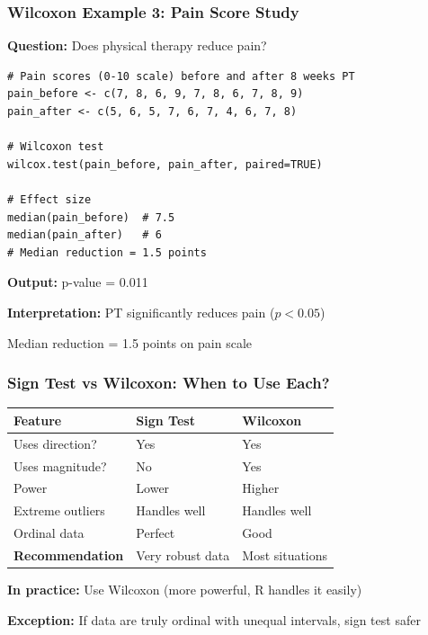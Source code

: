 \documentclass{beamer}
\begin{document}
\begin{frame}[fragile]
\frametitle{Wilcoxon Example 3: Pain Score Study}
\textbf{Question:} Does physical therapy reduce pain?

\vspace{0.3cm}
\begin{small}
\begin{verbatim}
# Pain scores (0-10 scale) before and after 8 weeks PT
pain_before <- c(7, 8, 6, 9, 7, 8, 6, 7, 8, 9)
pain_after <- c(5, 6, 5, 7, 6, 7, 4, 6, 7, 8)

# Wilcoxon test
wilcox.test(pain_before, pain_after, paired=TRUE)

# Effect size
median(pain_before)  # 7.5
median(pain_after)   # 6
# Median reduction = 1.5 points
\end{verbatim}
\end{small}

\textbf{Output:} p-value = 0.011

\textbf{Interpretation:} PT significantly reduces pain ($p < 0.05$)

Median reduction = 1.5 points on pain scale
\end{frame}

\begin{frame}
\frametitle{Sign Test vs Wilcoxon: When to Use Each?}

\begin{center}
\small
\begin{tabular}{lp{4cm}p{4cm}}
\toprule
\textbf{Feature} & \textbf{Sign Test} & \textbf{Wilcoxon} \\
\midrule
Uses direction? & Yes & Yes \\
Uses magnitude? & No & Yes \\
Power & Lower & Higher \\
Extreme outliers & Handles well & Handles well \\
Ordinal data & Perfect & Good \\
\midrule
\textbf{Recommendation} & Very robust data & Most situations \\
\bottomrule
\end{tabular}
\end{center}

\vspace{0.5cm}
\textbf{In practice:} Use Wilcoxon (more powerful, R handles it easily)

\textbf{Exception:} If data are truly ordinal with unequal intervals, sign test safer
\end{frame}
\end{document}

